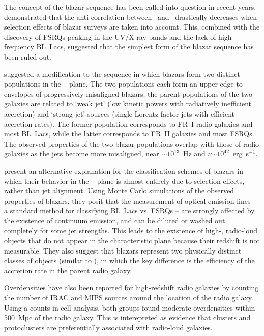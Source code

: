 \documentclass[useAMS,usenatbib]{mn2e}
\begin{document}
The concept of the blazar sequence has been called into question in recent years. \citet{pad07} demonstrated that the anti-correlation between \lpeak~and \nupeak~drastically decreases when selection effects of blazar surveys are taken into account. This, combined with the discovery of FSRQs peaking in the UV/X-ray bands \citep{pad03,lan08a} and the lack of high-frequency BL~Lacs, suggested that the simplest form of the blazar sequence has been ruled out. 

\citet{mey11} suggested a modification to the sequence in which blazars form two distinct populations in the \nupeak-\lpeak~plane. The two populations each form an upper edge to envelopes of progressively misaligned blazars; the parent populations of the two galaxies are related to `weak jet' (low kinetic powers with radiatively inefficient accretion) and `strong jet' sources (single Lorentz factor-jets with efficient accretion rates). The former population corresponds to FR~I radio galaxies and most BL~Lacs, while the latter corresponds to FR~II galaxies and most FSRQs. The observed properties of the two blazar populations overlap with those of radio galaxies as the jets become more misaligned, near \nupeak$\sim10^{13}$~Hz and $\nu$\lpeak$\sim10^{42}$~erg~s$^{-1}$. 

\citet{gio12} present an alternative explanation for the classification schemes of blazars in which their behavior in the \nupeak-\lpeak~plane is almost entirely due to selection effects, rather than jet alignment. Using Monte Carlo simulations of the observed properties of blazars, they posit that the measurement of optical emission lines -- a standard method for classifying BL~Lacs vs. FSRQs -- are strongly affected by the existence of continuum emission, and can be diluted or washed out completely for some jet strengths. This leads to the existence of high-\nupeak, radio-loud objects that do not appear in the characteristic plane because their redshift is not measurable. They also suggest that blazars represent two physically distinct classes of objects (similar to \citet{mey11}), in which the key difference is the efficiency of the accretion rate in the parent radio galaxy. 

Overdensities have also been reported for high-redshift radio galaxies by counting the number of IRAC \citep{gal12} and MIPS \citep{may12} sources around the location of the radio galaxy. Using a counts-in-cell analysis, both groups found moderate overdensities within 500~Mpc of the radio galaxy. This is interepreted as evidence that clusters and protoclusters are preferentially associated with radio-loud galaxies. 
\end{document}

